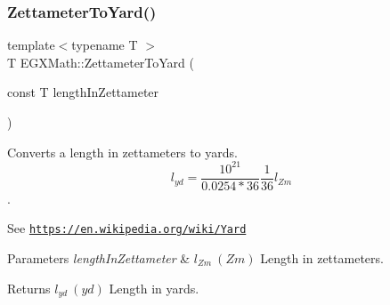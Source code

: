 \subsubsection{\texorpdfstring{Zettameter\+To\+Yard()}{ZettameterToYard()}}
{\footnotesize\ttfamily template$<$typename T $>$ \\
T E\+G\+X\+Math\+::\+Zettameter\+To\+Yard (\begin{DoxyParamCaption}\item[{const T}]{length\+In\+Zettameter }\end{DoxyParamCaption})}



Converts a length in zettameters to yards. \[ l_{yd}= \frac{10^{21}}{0.0254 * 36} \frac{1}{36} l_{Zm} \]. 

See \href{https://en.wikipedia.org/wiki/Yard}{\tt https\+://en.\+wikipedia.\+org/wiki/\+Yard} 
\begin{DoxyParams}{Parameters}
{\em length\+In\+Zettameter} & $ l_{Zm}\ (Zm)$ Length in zettameters. \\
\hline
\end{DoxyParams}
\begin{DoxyReturn}{Returns}
$ l_{yd}\ (yd)$ Length in yards. 
\end{DoxyReturn}
